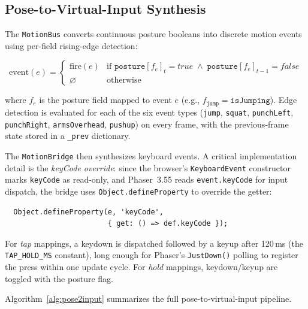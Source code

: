 \documentclass[runningheads]{llncs}
\newcommand{\motionbus}{\texttt{MotionBus}}
\newcommand{\motionbridge}{\texttt{MotionBridge}}
\begin{document}
\subsection{Pose-to-Virtual-Input Synthesis}
\label{sec:pose2input}

The \motionbus{} converts continuous posture booleans into discrete motion
events using per-field rising-edge detection:

\begin{equation}
  \text{event}(e) =
  \begin{cases}
    \text{fire}(e) & \text{if } \texttt{posture}[f_e]_{t} = \mathit{true}
                      \;\land\; \texttt{posture}[f_e]_{t-1} = \mathit{false} \\
    \varnothing     & \text{otherwise}
  \end{cases}
  \label{eq:edge}
\end{equation}

\noindent where $f_e$ is the posture field mapped to event $e$ (e.g., $f_{\texttt{jump}} = \texttt{isJumping}$).
Edge detection is evaluated for each of the six event types (\texttt{jump},
\texttt{squat}, \texttt{punchLeft}, \texttt{punchRight}, \texttt{armsOverhead},
\texttt{pushup}) on every frame, with the previous-frame state stored in
a \texttt{\_prev} dictionary.

The \motionbridge{} then synthesizes keyboard events. A critical
implementation detail is the \emph{keyCode override}: since the browser's
\texttt{KeyboardEvent} constructor marks \texttt{keyCode} as read-only,
and Phaser~3.55 reads \texttt{event.keyCode} for input dispatch, the bridge
uses \texttt{Object.defineProperty} to override the getter:

\begin{verbatim}
  Object.defineProperty(e, 'keyCode',
                        { get: () => def.keyCode });
\end{verbatim}

For \emph{tap} mappings, a keydown is dispatched followed by a keyup after
120\,ms (the \texttt{TAP\_HOLD\_MS} constant), long enough for Phaser's
\texttt{JustDown()} polling to register the press within one update cycle.
For \emph{hold} mappings, keydown/keyup are toggled with the posture flag.

Algorithm~\ref{alg:pose2input} summarizes the full pose-to-virtual-input
pipeline.
\end{document}
